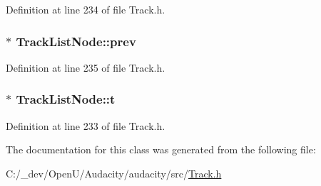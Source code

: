 Definition at line 234 of file Track.\+h.

\subsubsection[{\texorpdfstring{prev}{prev}}]{$\ast$ Track\+List\+Node\+::prev}\hypertarget{struct_track_list_node_a64fd2e1b6e421a0ff6438d828074e4c5}{}\label{struct_track_list_node_a64fd2e1b6e421a0ff6438d828074e4c5}


Definition at line 235 of file Track.\+h.

\subsubsection[{\texorpdfstring{t}{t}}]{$\ast$ Track\+List\+Node\+::t}\hypertarget{struct_track_list_node_a26289d63f33d878f15946ad938f7d73a}{}\label{struct_track_list_node_a26289d63f33d878f15946ad938f7d73a}


Definition at line 233 of file Track.\+h.



The documentation for this class was generated from the following file\+:\begin{DoxyCompactItemize}
\item 
C\+:/\+\_\+dev/\+Open\+U/\+Audacity/audacity/src/\hyperlink{src_2track_8h}{Track.\+h}\end{DoxyCompactItemize}
